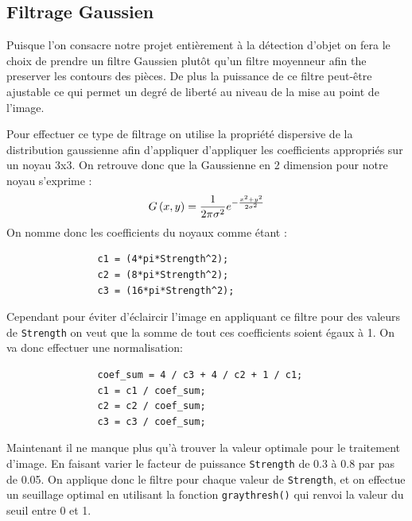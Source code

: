 \documentclass[11pt, openright]{book}
\begin{document}
		\subsection{Filtrage Gaussien}
			
			Puisque l'on consacre notre projet entièrement à la détection d'objet on fera le choix de prendre un filtre Gaussien plutôt qu'un filtre moyenneur afin the preserver les contours des pièces. De plus la puissance de ce filtre peut-être ajustable ce qui permet un degré de liberté au niveau de la mise au point de l'image. 

			Pour effectuer ce type de filtrage on utilise la propriété dispersive de la distribution gaussienne afin d'appliquer d'appliquer les coefficients appropriés sur un noyau 3x3. On retrouve donc que la Gaussienne en 2 dimension pour notre noyau s'exprime : 
			\begin{equation*}
				\displaystyle{G\left(x,y  \right) =\frac{1}{2\pi\sigma^2}e^{-\frac{x^2+y^2}{2\sigma^2}}}
			\end{equation*}
			On nomme donc les coefficients du noyaux comme étant : 
			\begin{lstlisting}
				c1 = (4*pi*Strength^2);
				c2 = (8*pi*Strength^2);
				c3 = (16*pi*Strength^2);	
			\end{lstlisting}
			Cependant pour éviter d'éclaircir l'image en appliquant ce filtre pour des valeurs de \texttt{Strength} on veut que la somme de tout ces coefficients soient égaux à 1. On va donc effectuer une normalisation: 
			\begin{lstlisting}
				coef_sum = 4 / c3 + 4 / c2 + 1 / c1;
				c1 = c1 / coef_sum;
				c2 = c2 / coef_sum;
				c3 = c3 / coef_sum;
			\end{lstlisting}
			Maintenant il ne manque plus qu'à trouver la valeur optimale pour le traitement d'image. En faisant varier le facteur de puissance \texttt{Strength} de 0.3 à 0.8 par pas de 0.05. 
			On applique donc le filtre pour chaque valeur de \texttt{Strength}, et on effectue un seuillage optimal en utilisant la fonction \texttt{graythresh()} qui renvoi la valeur du seuil entre 0 et 1.
\end{document}
